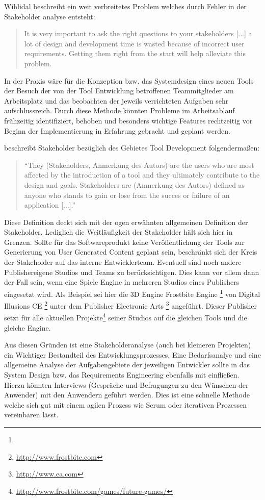\documentclass[pagesize, paper=a4, fontsize=12pt, titlepage=true, headings=small, headnosepline, abstractoff, liststotoc, nochapterprefix, plainheadsepline, twoside]{scrreprt}
\begin{document}
Wihlidal beschreibt ein weit verbreitetes Problem welches durch Fehler in der Stakeholder analyse entsteht:
\begin{quote}
It is very important to ask the right questions to your stakeholders [...] a lot of design and development time is wasted because of incorrect user requirements. Getting them right from the start will help alleviate this problem.
\autocite[S. 28]{Wihlidal2006}
\end{quote}



In der Praxis wäre für die Konzeption bzw. das Systemdesign eines neuen Tools der Besuch der von der Tool Entwicklung betroffenen Teammitglieder am Arbeitsplatz und das beobachten der jeweils verrichteten Aufgaben sehr aufschlussreich. Durch diese Methode könnten Probleme im Arbeitsablauf frühzeitig identifiziert, behoben und besonders wichtige Features rechtzeitig vor Beginn der Implementierung in Erfahrung gebracht und geplant werden.

\autocite{Wihlidal2006} beschreibt Stakeholder bezüglich des Gebietes Tool Development folgendermaßen:
\begin{quote}
“They (Stakeholders, Anmerkung des Autors) are the users who are most affected by the introduction of a tool and they ultimately contribute to the design and goals. Stakeholders are (Anmerkung des Autors) defined as anyone who stands to gain or lose from the succes or failure of an application [...].” \autocite[S. 4-5]{Wihlidal2006}
\end{quote}
Diese Definition deckt sich mit der ogen erwähnten allgemeinen Definition der Stakeholder. Lediglich die Weitläufigkeit der Stakeholder hält sich hier in Grenzen. Sollte für das Softwareprodukt keine Veröffentlichung der Tools zur Generierung von User Generated Content geplant sein, beschränkt sich der Kreis der Stakeholder auf das interne Entwicklerteam. Eventuell sind noch andere Publishereigene Studios und Teams zu berücksichtigen. Dies kann vor allem dann der Fall sein, wenn eine Spiele Engine in mehreren Studios eines Publishers eingesetzt wird. Als Beispiel sei hier die 3D Engine Frostbite Engine \footnote{} von Digital Illusions CE \footnote{\url{http://www.frostbite.com}} unter dem Publisher Electronic Arts \footnote{\url{http://www.ea.com}} angeführt. Dieser Publisher setzt für alle aktuellen Projekte\footnote{\url{http://www.frostbite.com/games/future-games/}} seiner Studios auf die gleichen Tools und die gleiche Engine.

Aus diesen Gründen ist eine Stakeholderanalyse (auch bei kleineren Projekten) ein Wichtiger Bestandteil des Entwicklungsprozesses. Eine Bedarfsanalye und eine allgemeine Analyse der Aufgabengebiete der jeweiligen Entwickler sollte in das System Design bzw. das Requirements Engineering ebenfalls mit einfließen. Hierzu könnten Interviews (Gespräche und Befragungen zu den Wünschen der Anwender) mit den Anwendern geführt werden. Dies ist eine schnelle Methode welche sich gut mit einem agilen Prozess wie Scrum oder iterativen Prozessen vereinbaren lässt.
\end{document}
